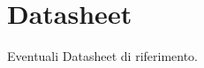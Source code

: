 \chapter{Datasheet}
\label{appendixF}
\thispagestyle{empty}

\noindent Eventuali Datasheet di riferimento.